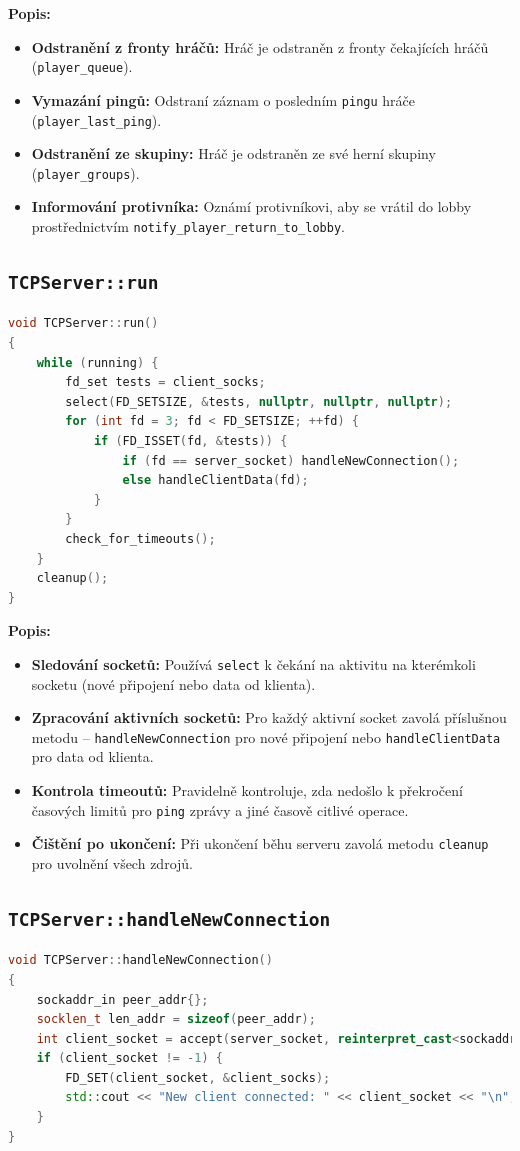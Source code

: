 \documentclass[12pt, a4paper]{article}
\begin{document}
\noindent
\textbf{Popis:}
\begin{itemize}
    \item \textbf{Odstranění z fronty hráčů:} Hráč je odstraněn z fronty čekajících hráčů (\texttt{player\_queue}).
    \item \textbf{Vymazání pingů:} Odstraní záznam o posledním \texttt{pingu} hráče (\texttt{player\_last\_ping}).
    \item \textbf{Odstranění ze skupiny:} Hráč je odstraněn ze své herní skupiny (\texttt{player\_groups}).
    \item \textbf{Informování protivníka:} Oznámí protivníkovi, aby se vrátil do lobby prostřednictvím \texttt{notify\_player\_return\_to\_lobby}.
\end{itemize}
\newpage
\subsection{\texttt{TCPServer::run}}
\begin{lstlisting}[language=C++, caption={Hlavní smyčka serveru}]
void TCPServer::run()
{
    while (running) {
        fd_set tests = client_socks;
        select(FD_SETSIZE, &tests, nullptr, nullptr, nullptr);
        for (int fd = 3; fd < FD_SETSIZE; ++fd) {
            if (FD_ISSET(fd, &tests)) {
                if (fd == server_socket) handleNewConnection();
                else handleClientData(fd);
            }
        }
        check_for_timeouts();
    }
    cleanup();
}
\end{lstlisting}

\noindent
\textbf{Popis:}
\begin{itemize}
    \item \textbf{Sledování socketů:} Používá \texttt{select} k čekání na aktivitu na kterémkoli socketu (nové připojení nebo data od klienta).
    \item \textbf{Zpracování aktivních socketů:} Pro každý aktivní socket zavolá příslušnou metodu – \texttt{handleNewConnection} pro nové připojení nebo \texttt{handleClientData} pro data od klienta.
    \item \textbf{Kontrola timeoutů:} Pravidelně kontroluje, zda nedošlo k překročení časových limitů pro \texttt{ping} zprávy a jiné časově citlivé operace.
    \item \textbf{Čištění po ukončení:} Při ukončení běhu serveru zavolá metodu \texttt{cleanup} pro uvolnění všech zdrojů.
\end{itemize}
\newpage
\subsection{\texttt{TCPServer::handleNewConnection}}
\begin{lstlisting}[language=C++, caption={Zpracování nového připojení}]
void TCPServer::handleNewConnection()
{
    sockaddr_in peer_addr{};
    socklen_t len_addr = sizeof(peer_addr);
    int client_socket = accept(server_socket, reinterpret_cast<sockaddr *>(&peer_addr), &len_addr);
    if (client_socket != -1) {
        FD_SET(client_socket, &client_socks);
        std::cout << "New client connected: " << client_socket << "\n";
    }
}
\end{lstlisting}
\end{document}
